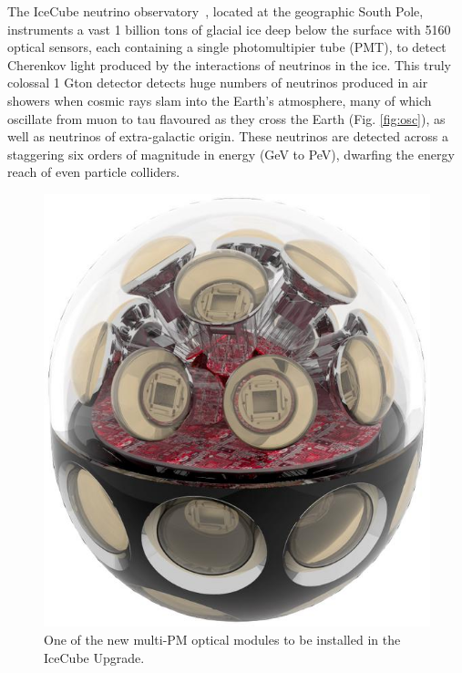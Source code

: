 \documentclass[a4paper,11pt]{article}
\begin{document}
The IceCube neutrino observatory~\cite{Aartsen_2017}, located at the geographic South Pole, instruments a vast 1 billion tons of glacial ice deep below the surface with 5160 optical sensors, each containing a single photomultipier tube (PMT), to detect Cherenkov light produced by the interactions of neutrinos in the ice. This truly colossal 1 Gton detector detects huge numbers of neutrinos produced in air showers when cosmic rays slam into the Earth's atmosphere, many of which oscillate from muon to tau flavoured as they cross the Earth (Fig. \ref{fig:osc}), as well as neutrinos of extra-galactic origin. These neutrinos are detected across a staggering six orders of magnitude in energy (GeV to PeV), dwarfing the energy reach of even particle colliders. 


\begin{figure} %
    \centering
	\includegraphics[width=1.\linewidth]{images/mdom.jpg}
	\caption{One of the new multi-PM optical modules to be installed in the IceCube Upgrade.}
	\label{fig:mDOM}
\end{figure}
\end{document}
